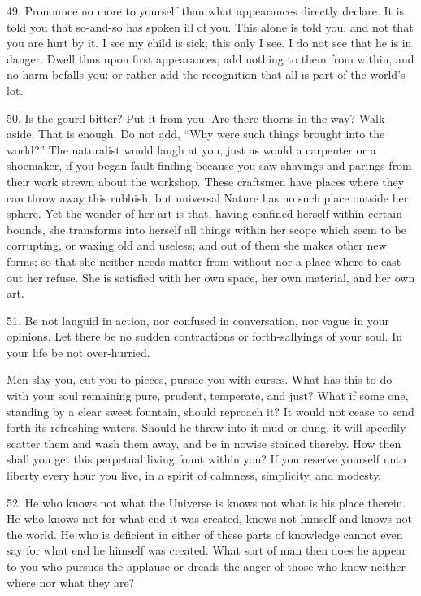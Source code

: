 \documentclass{book}
\begin{document}
49. Pronounce no more to yourself than what appearances directly
declare. It is told you that so-and-so has spoken ill of you. This
alone is told you, and not that you are hurt by it. I see my child is
sick; this only I see. I do not see that he is in danger. Dwell thus
upon first appearances; add nothing to them from within, and no harm
befalls you: or rather add the recognition that all is part of the
world's lot.

50. Is the gourd bitter? Put it from you. Are there thorns in the way?
Walk aside. That is enough. Do not add, ``Why were such things brought
into the world?'' The naturalist would laugh at you, just as would a
carpenter or a shoemaker, if you began fault-finding because you saw
shavings and parings from their work strewn about the workshop. These
craftsmen have places where they can throw away this rubbish, but
universal Nature has no such place outside her sphere. Yet the wonder
of her art is that, having confined herself within certain bounds, she
transforms into herself all things within her scope which seem to be
corrupting, or waxing old and useless; and out of them she makes other
new forms; so that she neither needs matter from without nor a place
where to cast out her refuse. She is satisfied with her own space, her
own material, and her own art.

51. Be not languid in action, nor confused in conversation, nor vague
in your opinions. Let there be no sudden contractions or
forth-sallyings of your soul. In your life be not over-hurried.

Men slay you, cut you to pieces, pursue you with curses. What has this
to do with your soul remaining pure, prudent, temperate, and just?
What if some one, standing by a clear sweet fountain, should reproach
it? It would not cease to send forth its refreshing waters. Should he
throw into it mud or dung, it will speedily scatter them and wash them
away, and be in nowise stained thereby. How then shall you get this
perpetual living fount within you? If you reserve yourself unto
liberty every hour you live, in a spirit of calmness, simplicity, and
modesty.

52. He who knows not what the Universe is knows not what is his place
therein. He who knows not for what end it was created, knows not
himself and knows not the world. He who is deficient in either of
these parts of knowledge cannot even say for what end he himself was
created. What sort of man then does he appear to you who pursues the
applause or dreads the anger of those who know neither where nor what
they are?
\end{document}
